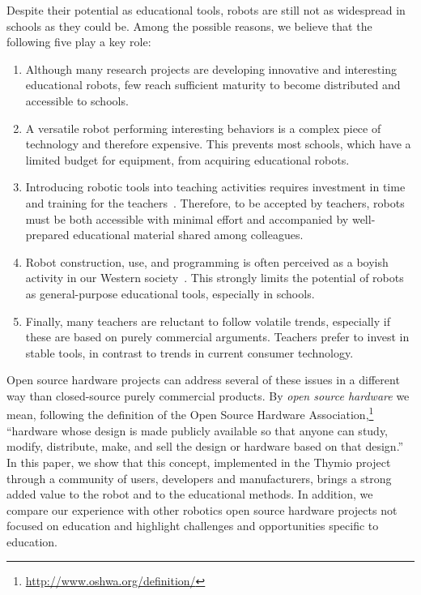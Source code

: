 \documentclass[letterpaper, 10 pt, conference]{ieeeconf}  %
\begin{document}
Despite their potential as educational tools, robots are still not as widespread in schools as they could be. Among the possible reasons, we believe that the following five play a key role:
\begin{enumerate}
\item Although many research projects are developing innovative and interesting educational robots, few reach sufficient maturity to become distributed and accessible to schools. 
\item A versatile robot performing interesting behaviors is a complex piece of technology and therefore expensive. 
This prevents most schools, which have a limited budget for equipment, from acquiring educational robots.
\item Introducing robotic tools into teaching activities requires investment in time and training for the teachers~\cite{CERI2008}.
Therefore, to be accepted by teachers, robots must be both accessible with minimal effort and accompanied by well-prepared educational material shared among colleagues. 
\item Robot construction, use, and programming is often perceived as a boyish activity in our Western society~\cite{leonard2009lego,nourbakhsh2009robot}.
This strongly limits the potential of robots as general-purpose educational tools, especially in schools.
\item Finally, many teachers are reluctant to follow volatile trends, especially if these are based on purely commercial arguments.
Teachers prefer to invest in stable tools, in contrast to trends in current consumer technology. %
\end{enumerate}

Open source hardware projects can address several of these issues in a different way than closed-source purely commercial products. 
By \textit{open source hardware} we mean, following the definition of the Open Source Hardware Association,\footnote{\url{http://www.oshwa.org/definition/}} ``hardware whose design is made publicly available so that anyone can study, modify, distribute, make, and sell the design or hardware based on that design.''
In this paper, we show that this concept, implemented in the Thymio project through a community of users, developers and manufacturers, brings a strong added value to the robot and to the educational methods.
In addition, we compare our experience with other robotics open source hardware projects not focused on education and highlight challenges and opportunities specific to education.
\end{document}

